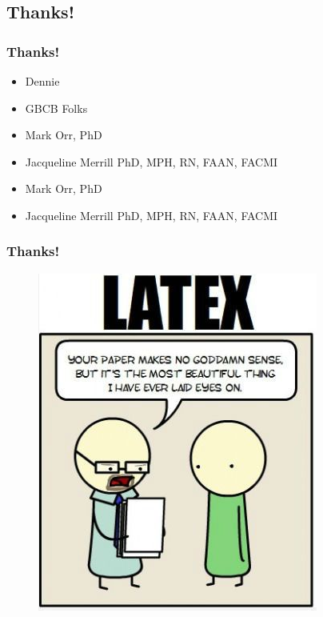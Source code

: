 \documentclass[compress]{beamer}
\begin{document}
\subsection{Thanks!}

    \begin{frame}[Basic2] \frametitle{Thanks!}
        \begin{itemize}
            \item Dennie
            \item GBCB Folks
        \end{itemize}

        \begin{itemize}
            \item Mark Orr, PhD
            \item Jacqueline Merrill PhD, MPH, RN, FAAN, FACMI
        \end{itemize}

        \begin{itemize}
            \item Mark Orr, PhD
            \item Jacqueline Merrill PhD, MPH, RN, FAAN, FACMI
        \end{itemize}

    \end{frame}
    
    \begin{frame}[Basic2] \frametitle{Thanks!}
        \vspace{3mm}
        \begin{figure}
            \centering
            \includegraphics[height=0.7\textheight]{../figures/programming-comic-latex}
            \caption{}
            \label{fig:programming-comic-latex}
        \end{figure}
    \end{frame}
\end{document}
